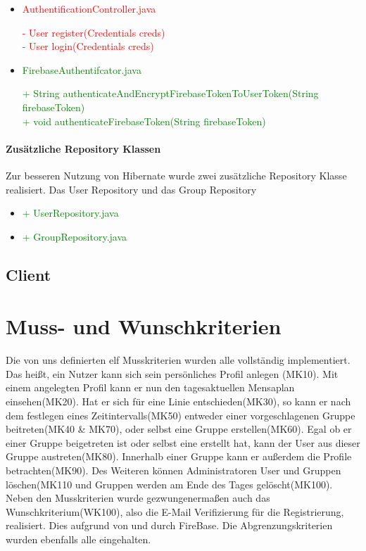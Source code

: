 \documentclass[a4paper]{scrreprt}
\begin{document}
\begin{itemize}
\item\textcolor{red}{AuthentificationController.java}

\textcolor{red}{- User register(Credentials creds)}\\
\textcolor{red}{- User login(Credentials creds)}\\

\item\textcolor{green}{FirebaseAuthentifcator.java}

\textcolor{green}{+ String authenticateAndEncryptFirebaseTokenToUserToken(String firebaseToken)}\\
\textcolor{green}{+ void authenticateFirebaseToken(String firebaseToken)}
\end{itemize}

\subsubsection{Zusätzliche Repository Klassen}
Zur besseren Nutzung von Hibernate wurde zwei zusätzliche Repository Klasse realisiert. Das User Repository und das Group Repository

\begin{itemize}
\item\textcolor{green}{+ UserRepository.java}
\item\textcolor{green}{+ GroupRepository.java}
\end{itemize}


\section{Client}

\chapter{Muss- und Wunschkriterien}
Die von uns definierten elf Musskriterien wurden alle vollständig implementiert. Das heißt, ein Nutzer kann sich sein persönliches Profil anlegen (\Gls{MK10}). Mit einem angelegten Profil kann er nun den tagesaktuellen Mensaplan einsehen(\Gls{MK20}). Hat er sich für eine Linie entschieden(\Gls{MK30}), so kann er nach dem festlegen eines Zeitintervalls(\Gls{MK50}) entweder einer vorgeschlagenen Gruppe beitreten(\Gls{MK40} \& \Gls{MK70}), oder selbst eine Gruppe erstellen(\Gls{MK60}). Egal ob er einer Gruppe beigetreten ist oder selbst eine erstellt hat, kann der User aus dieser Gruppe austreten(\Gls{MK80}). Innerhalb einer Gruppe kann er außerdem die Profile betrachten(\Gls{MK90}). Des Weiteren können Administratoren User und Gruppen löschen(\Gls{MK110} und Gruppen werden am Ende des Tages gelöscht(\Gls{MK100}).
Neben den Musskriterien wurde gezwungenermaßen auch das Wunschkriterium(\Gls{WK100}), also die E-Mail Verifizierung für die Registrierung, realisiert. Dies aufgrund von und durch FireBase. Die Abgrenzungskriterien wurden ebenfalls alle eingehalten.
\end{document}
